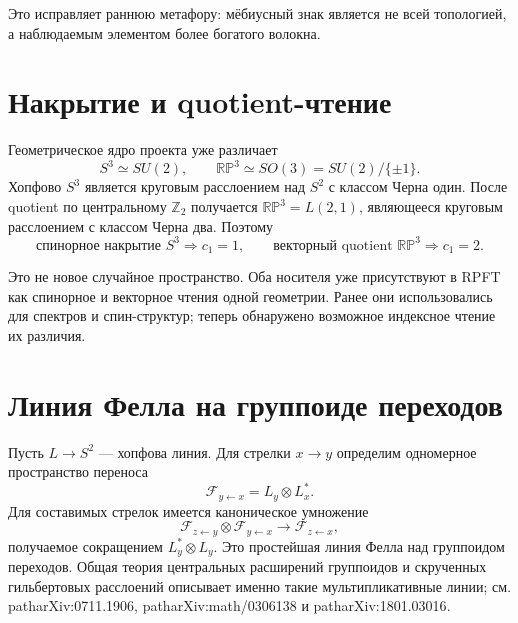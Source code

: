 Это исправляет раннюю метафору: мёбиусный знак является не всей
топологией, а наблюдаемым элементом более богатого волокна.

\section{Накрытие и quotient-чтение}

Геометрическое ядро проекта уже различает
\begin{equation}
 S^3\simeq SU(2),
 \qquad
 \mathbb{RP}^3\simeq SO(3)=SU(2)/\{\pm1\}.
\end{equation}
Хопфово $S^3$ является круговым расслоением над $S^2$ с классом Черна
один. После quotient по центральному $\mathbb Z_2$ получается
$\mathbb{RP}^3=L(2,1)$, являющееся круговым расслоением с классом Черна
два. Поэтому
\begin{equation}
 \boxed{
 \text{спинорное накрытие }S^3\Rightarrow c_1=1,
 \qquad
 \text{векторный quotient }\mathbb{RP}^3\Rightarrow c_1=2.}
 \label{eq:v5-hopf-cover-quotient-c1}
\end{equation}

Это не новое случайное пространство. Оба носителя уже присутствуют в
RPFT как спинорное и векторное чтения одной геометрии. Ранее они
использовались для спектров и спин-структур; теперь обнаружено возможное
индексное чтение их различия.

\section{Линия Фелла на группоиде переходов}

Пусть $L\to S^2$ --- хопфова линия. Для стрелки $x\to y$ определим
одномерное пространство переноса
\begin{equation}
 \mathcal F_{y\leftarrow x}=L_y\otimes L_x^*.
 \label{eq:v5-hopf-fell-arrow}
\end{equation}
Для составимых стрелок имеется каноническое умножение
\begin{equation}
 \mathcal F_{z\leftarrow y}\otimes
 \mathcal F_{y\leftarrow x}
 \longrightarrow
 \mathcal F_{z\leftarrow x},
 \label{eq:v5-hopf-fell-composition}
\end{equation}
получаемое сокращением $L_y^*\otimes L_y$. Это простейшая линия Фелла над
группоидом переходов. Общая теория центральных расширений группоидов и
скрученных гильбертовых расслоений описывает именно такие
мультипликативные линии; см. path{arXiv:0711.1906},
path{arXiv:math/0306138} и path{arXiv:1801.03016}.


